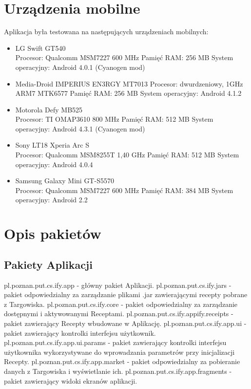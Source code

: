 \documentclass[11pt,a4paper,polish,thesis]{dcsbook}
\begin{document}
\section{Urządzenia mobilne}
Aplikacja była testowana na następujących urządzeniach mobilnych:
\begin{itemize}
\item{LG Swift GT540} \\
Procesor: Qualcomm MSM7227 600 MHz
Pamięć RAM: 256 MB
System operacyjny: Android 4.0.1 (Cyanogen mod)
\item{Media-Droid IMPERIUS EN3RGY MT7013}
Procesor: dwurdzeniowy, 1GHz ARM7 MTK6577
Pamięć RAM: 256 MB
System operacyjny: Android 4.1.2
\item{Motorola Defy MB525} \\
Procesor: TI OMAP3610 800 MHz
Pamięć RAM: 512 MB
System operacyjny: Android 4.3.1 (Cyanogen mod)
\item{Sony LT18 Xperia Arc S} \\
Procesor: Qualcomm MSM8255T 1,40 GHz
Pamięć RAM: 512 MB
System operacyjny: Android 4.0.4
\item{Samsung Galaxy Mini GT-S5570} \\
Procesor: Qualcomm MSM7227 600 MHz
Pamięć RAM: 384 MB
System operacyjny: Android 2.2
\end{itemize}

\section{Opis pakietów}
\subsection{Pakiety Aplikacji}
pl.poznan.put.cs.ify.app - główny pakiet Aplikacji.
pl.poznan.put.cs.ify.jars - pakiet odpowiedzialny za zarządzanie plikami .jar zawierającymi recepty pobrane z Targowiska.
pl.poznan.put.cs.ify.core - pakiet odpowiedzialny za zarządzanie dostępnymi i aktywowanymi Receptami.
pl.poznan.put.cs.ify.appify.receipts - pakiet zawierający Recepty wbudowane w Aplikację.
pl.poznan.put.cs.ify.app.ui - pakiet zawierający kontrolki interfejsu użytkownik.
pl.poznan.put.cs.ify.app.ui.params - pakiet zawierający kontrolki interfejsu użytkownika wykorzystywane do wprowadzania parametrów przy inicjalizacji Recepty.
pl.poznan.put.cs.ify.app.market - pakiet odpowiedzialny za pobieranie danych z Targowiska i wyświetlanie ich.
pl.poznan.put.cs.ify.app.fragments - pakiet zawierający widoki ekranów aplikacji.
\end{document}
